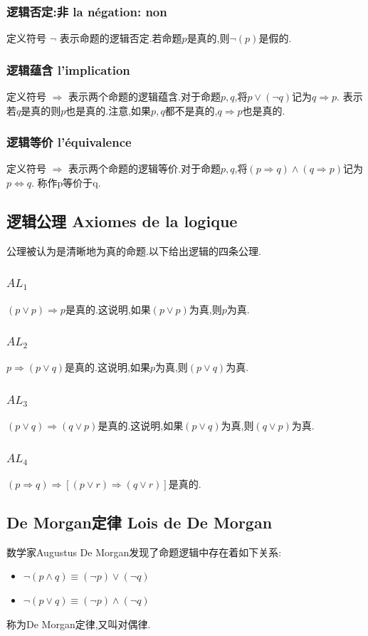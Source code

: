 \documentclass[12pt, a4paper, oneside]{ctexbook}
\begin{document}
  \subsubsection{逻辑否定:非  la négation: non}
  定义符号 $\lnot $ 表示命题的逻辑否定.若命题$p$是真的,则$\lnot(p)$是假的.
  \subsubsection{逻辑蕴含 l'implication}
  定义符号 $\Rightarrow$ 表示两个命题的逻辑蕴含.对于命题$p,q$,将$p\lor(\lnot q)$记为$q\Rightarrow p$.
  表示若$q$是真的则$p$也是真的.注意,如果$p,q$都不是真的,$q\Rightarrow p$也是真的.
  \subsubsection{逻辑等价 l'équivalence}
  定义符号 $\Rightarrow$ 表示两个命题的逻辑等价.对于命题$p,q$,将$(p\Rightarrow q)\land (q\Rightarrow p)$记为$p\Leftrightarrow q$.
  称作p等价于q.
  \subsection{逻辑公理 Axiomes de la logique}
  公理被认为是清晰地为真的命题.以下给出逻辑的四条公理.
  \subsubsection{$AL_1$}
  $(p\lor p)\Rightarrow p$是真的.这说明,如果$(p\lor p)$为真,则$p$为真.
  \subsubsection{$AL_2$}
  $p\Rightarrow (p\lor q)$是真的.这说明,如果$p$为真,则$(p\lor q)$为真.
  \subsubsection{$AL_3$}
  $(p\lor q)\Rightarrow (q\lor p)$是真的.这说明,如果$(p\lor q)$为真,则$(q\lor p)$为真.
  \subsubsection{$AL_4$}
  $(p\Rightarrow q)\Rightarrow [(p\lor r)\Rightarrow(q\lor r)]$是真的.
  \subsection{De Morgan定律 Lois de De Morgan}
  数学家Augustus De Morgan发现了命题逻辑中存在着如下关系:
  \begin{itemize}
    \item $\lnot (p\wedge q)\equiv (\lnot p)\vee (\lnot q) $
    \item $\lnot (p\vee q)\equiv (\lnot p)\wedge (\lnot q) $
  \end{itemize}称为De Morgan定律,又叫对偶律.
\end{document}
